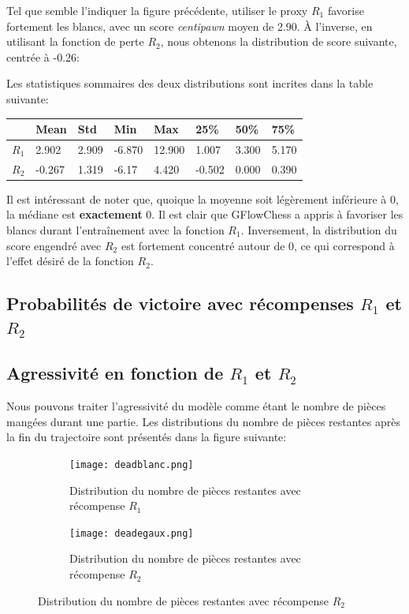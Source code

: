 \documentclass[11pt]{article}
\begin{document}
Tel que semble l'indiquer la figure précédente, utiliser le proxy
$R_{1}$ favorise fortement les blancs, avec un score
\textit{centipawn} moyen de 2.90.  À l'inverse, en utilisant la
fonction de perte $R_{2}$, nous obtenons la distribution de score
suivante, centrée à -0.26:

Les statistiques sommaires des deux distributions sont incrites dans
la table suivante:

\begin{table}[!ht]
  \centering
	\begin{tabular}{|l|l|l|l|l|l|l|l|}
	  \hline
	  ~     & Mean   & Std   & Min    & Max    & 25\%   & 50\%  & 75\%  \\ \hline
	  $R_1$ & 2.902  & 2.909 & -6.870 & 12.900 & 1.007  & 3.300 & 5.170 \\ \hline
	  $R_2$ & -0.267 & 1.319 & -6.17  & 4.420  & -0.502 & 0.000 & 0.390 \\ \hline
	\end{tabular}
\end{table}
Il est intéressant de noter que, quoique la moyenne soit légèrement
inférieure à 0, la médiane est \textbf{exactement} 0. Il est clair que
GFlowChess a appris à favoriser les blancs durant l'entraînement avec
la fonction $R_{1}$. Inversement, la distribution du score engendré
avec $R_{2}$ est fortement concentré autour de 0, ce qui correspond à
l'effet désiré de la fonction $R_{2}$.
\subsection*{Probabilités de victoire avec récompenses $R_{1}$ et $R_{2}$}

\subsection*{Agressivité en fonction de $R_{1}$ et $R_{2}$}
Nous pouvons traiter l'agressivité du modèle comme étant le nombre de
pièces mangées durant une partie. Les distributions du nombre de
pièces restantes après la fin du trajectoire sont présentés dans la
figure suivante:
\begin{figure}[H]
  \centering
	\begin{subfigure}[b]{0.45\textwidth}
	  \centering \texttt{[image: deadblanc.png]}
	  \caption{Distribution du nombre de pièces restantes avec
            récompense $R_{1}$}
		\label{deadblancs}
	\end{subfigure}
	\begin{subfigure}[b]{0.45\textwidth}
	  \centering \texttt{[image: deadegaux.png]}
	  \caption{Distribution du nombre de pièces restantes avec
            récompense $R_{2}$}
		\label{deadegaux}
	\end{subfigure}
\end{figure}
\end{document}
